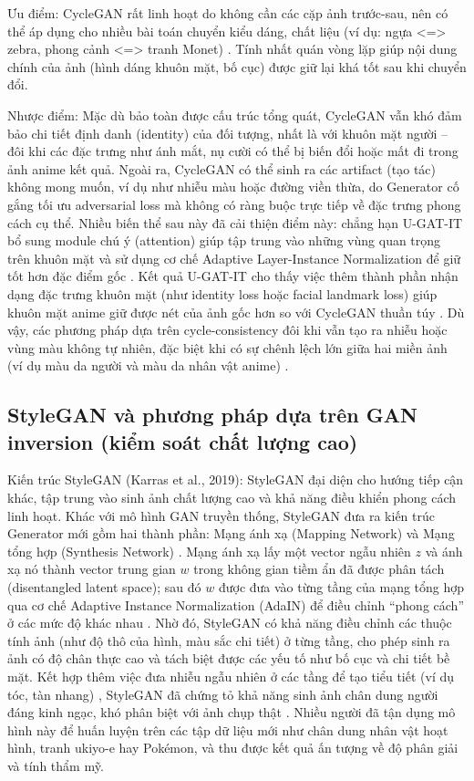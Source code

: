 Ưu điểm: CycleGAN rất linh hoạt do không cần các cặp ảnh trước-sau, nên có thể áp dụng cho nhiều bài
toán chuyển kiểu dáng, chất liệu (ví dụ: ngựa <=> zebra, phong cảnh <=> tranh Monet) \cite{Zhu2017}. Tính nhất quán
vòng lặp giúp nội dung chính của ảnh (hình dáng khuôn mặt, bố cục) được giữ lại khá tốt sau khi chuyển
đổi. 

Nhược điểm: Mặc dù bảo toàn được cấu trúc tổng quát, CycleGAN vẫn khó đảm bảo chi tiết định danh
(identity) của đối tượng, nhất là với khuôn mặt người – đôi khi các đặc trưng như ánh mắt, nụ cười có thể
bị biến đổi hoặc mất đi trong ảnh anime kết quả. Ngoài ra, CycleGAN có thể sinh ra các artifact (tạo tác)
không mong muốn, ví dụ như nhiễu màu hoặc đường viền thừa, do Generator cố gắng tối ưu adversarial
loss mà không có ràng buộc trực tiếp về đặc trưng phong cách cụ thể. Nhiều biến thể sau này đã cải thiện
điểm này: chẳng hạn U-GAT-IT \cite{Kim2020} bổ sung module chú ý (attention) giúp tập trung vào
những vùng quan trọng trên khuôn mặt và sử dụng cơ chế Adaptive Layer-Instance Normalization để
giữ tốt hơn đặc điểm gốc \cite{Kim2020}. Kết quả U-GAT-IT cho thấy việc thêm thành phần nhận dạng đặc trưng khuôn
mặt (như identity loss hoặc facial landmark loss) giúp khuôn mặt anime giữ được nét của ảnh gốc hơn so
với CycleGAN thuần túy \cite{Kim2020}. Dù vậy, các phương pháp dựa trên cycle-consistency đôi khi vẫn tạo ra
nhiễu hoặc vùng màu không tự nhiên, đặc biệt khi có sự chênh lệch lớn giữa hai miền ảnh (ví dụ màu da
người và màu da nhân vật anime) \cite{Zhu2017}.

\subsection{StyleGAN và phương pháp dựa trên GAN inversion (kiểm soát chất lượng cao)}
Kiến trúc StyleGAN (Karras et al., 2019): StyleGAN đại diện cho hướng tiếp cận khác, tập trung vào sinh
ảnh chất lượng cao và khả năng điều khiển phong cách linh hoạt. Khác với mô hình GAN truyền thống,
StyleGAN đưa ra kiến trúc Generator mới gồm hai thành phần: Mạng ánh xạ (Mapping Network) và Mạng
tổng hợp (Synthesis Network) \cite{Karras2019}. Mạng ánh xạ lấy một vector ngẫu nhiên $z$ và ánh xạ nó thành vector
trung gian $w$ trong không gian tiềm ẩn đã được phân tách (disentangled latent space); sau đó $w$
được đưa vào từng tầng của mạng tổng hợp qua cơ chế Adaptive Instance Normalization (AdaIN) để
điều chỉnh “phong cách” ở các mức độ khác nhau \cite{Karras2019}. Nhờ đó, StyleGAN có khả năng điều chỉnh các thuộc
tính ảnh (như độ thô của hình, màu sắc chi tiết) ở từng tầng, cho phép sinh ra ảnh có độ chân thực cao và
tách biệt được các yếu tố như bố cục và chi tiết bề mặt. Kết hợp thêm việc đưa nhiễu ngẫu nhiên ở các tầng
để tạo tiểu tiết (ví dụ tóc, tàn nhang) , StyleGAN đã chứng tỏ khả năng sinh ảnh chân dung người đáng
kinh ngạc, khó phân biệt với ảnh chụp thật \cite{Karras2019}. Nhiều người đã tận dụng mô hình này để huấn luyện trên
các tập dữ liệu mới như chân dung nhân vật hoạt hình, tranh ukiyo-e hay Pokémon, và thu được kết quả ấn
tượng về độ phân giải và tính thẩm mỹ.

